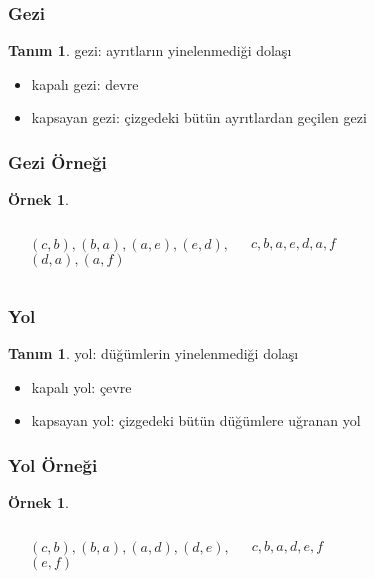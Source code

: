 \documentclass[dvipsnames]{beamer}
\theoremstyle{definition}
\newtheorem{tanim}[theorem]{Tanım}
\theoremstyle{example}
\newtheorem{ornek}[theorem]{Örnek}
\theoremstyle{plain}
\begin{document}
\begin{frame}
  \frametitle{Gezi}

  \begin{tanim}
    \alert{gezi}: ayrıtların yinelenmediği dolaşı

    \pause
    \begin{itemize}
      \item kapalı gezi: \alert{devre}
      \item \alert{kapsayan gezi}: çizgedeki bütün ayrıtlardan geçilen gezi
    \end{itemize}
  \end{tanim}
\end{frame}

\begin{frame}
  \frametitle{Gezi Örneği}

  \begin{ornek}
    \begin{columns}
      \begin{center}
      \end{center}

      $(c,b),(b,a),(a,e),(e,d),$\\
      $(d,a),(a,f)$

      \medskip
      $c,b,a,e,d,a,f$
    \end{columns}
  \end{ornek}
\end{frame}

\begin{frame}
  \frametitle{Yol}

  \begin{tanim}
    \alert{yol}: düğümlerin yinelenmediği dolaşı

    \pause
    \begin{itemize}
      \item kapalı yol: \alert{çevre}
      \item \alert{kapsayan yol}: çizgedeki bütün düğümlere uğranan yol
    \end{itemize}
  \end{tanim}
\end{frame}

\begin{frame}
  \frametitle{Yol Örneği}

  \begin{ornek}
    \begin{columns}
      \begin{center}
      \end{center}

      $(c,b),(b,a),(a,d),(d,e),$\\
      $(e,f)$

      \medskip
      $c,b,a,d,e,f$
    \end{columns}
  \end{ornek}
\end{frame}
\end{document}
